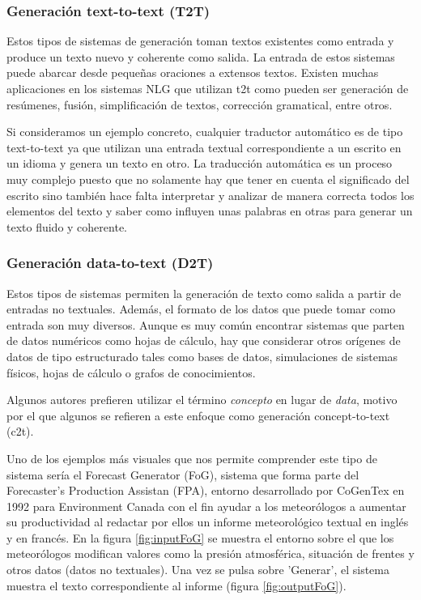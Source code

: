 \subsubsection{Generación text-to-text (T2T)}
Estos tipos de sistemas de generación toman textos existentes como entrada y produce un texto nuevo y coherente como salida. La entrada de estos sistemas puede abarcar desde pequeñas oraciones a extensos textos. Existen muchas aplicaciones en los sistemas NLG que utilizan t2t como pueden ser generación de resúmenes, fusión, simplificación de textos, corrección gramatical, entre otros.

Si consideramos un ejemplo concreto, cualquier traductor automático es de tipo text-to-text ya que utilizan una entrada textual correspondiente a un escrito en un idioma y genera un texto en otro. La traducción automática es un proceso muy complejo puesto que no solamente hay que tener en cuenta el significado del escrito sino también hace falta interpretar y analizar de manera correcta todos los elementos del texto y saber como influyen unas palabras en otras para generar un texto fluido y coherente.

\subsubsection{Generación data-to-text (D2T)}
Estos tipos de sistemas permiten la generación de texto como salida a partir de entradas no textuales. Además, el formato de los datos que puede tomar como entrada son muy diversos. Aunque es muy común encontrar sistemas que parten de datos numéricos como hojas de cálculo, hay que considerar otros orígenes de datos de tipo estructurado tales como bases de datos, simulaciones de sistemas físicos, hojas de cálculo o grafos de conocimientos. 

Algunos autores prefieren utilizar  el término \textit{concepto} en lugar de \textit{data}, motivo por el que algunos se refieren a este enfoque como generación concept-to-text (c2t). \citep{vicente2015generacion}

Uno de los ejemplos más visuales que nos permite comprender este tipo de sistema sería el Forecast Generator (FoG), sistema que forma parte del Forecaster's Production Assistan (FPA), entorno desarrollado por CoGenTex en 1992 para Environment Canada con el fin ayudar a los meteorólogos a aumentar su productividad al redactar por ellos un informe meteorológico textual en inglés y en francés. En la figura  \ref{fig:inputFoG} se muestra el entorno sobre el que los meteorólogos modifican valores como la presión atmosférica, situación de frentes y otros datos (datos no textuales). Una vez se pulsa sobre 'Generar', el sistema muestra el texto correspondiente al informe (figura \ref{fig:outputFoG}). 


